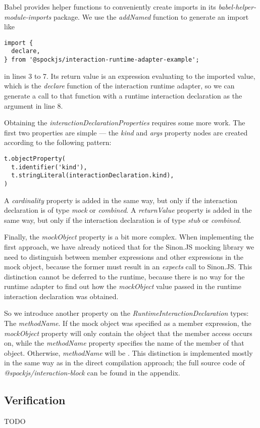 Babel provides helper functions to conveniently create imports
in its \textit{babel-helper-module-imports} package.
We use the \textit{addNamed} function to generate an import like
\begin{verbatim}
import {
  declare,
} from '@spockjs/interaction-runtime-adapter-example';
\end{verbatim}
in lines 3 to 7.
Its return value is an expression evaluating to the imported value,
which is the \textit{declare} function of the interaction runtime adapter,
so we can generate a call to that function
with a runtime interaction declaration as the argument in line 8.

Obtaining the \textit{interactionDeclarationProperties} requires some more work.
The first two properties are simple ---
the \textit{kind} and \textit{args} property nodes
are created according to the following pattern:
\begin{verbatim}
t.objectProperty(
  t.identifier('kind'),
  t.stringLiteral(interactionDeclaration.kind),
)
\end{verbatim}
A \textit{cardinality} property is added in the same way,
but only if the interaction declaration
is of type \textit{mock} or \textit{combined}.
A \textit{returnValue} property is added in the same way,
but only if the interaction declaration
is of type \textit{stub} or \textit{combined}.

Finally, the \textit{mockObject} property is a bit more complex.
When implementing the first approach,
we have already noticed that for the Sinon.JS mocking library
we need to distinguish between member expressions
and other expressions in the mock object,
because the former must result in an \textit{expects} call to Sinon.JS.
This distinction cannot be deferred to the runtime,
because there is no way for the runtime adapter
to find out how the \textit{mockObject} value
passed in the runtime interaction declaration was obtained.

So we introduce another property
on the \textit{RuntimeInteractionDeclaration} types:
The \textit{methodName}.
If the mock object was specified as a member expression,
the \textit{mockObject} property will only contain
the object that the member access occurs on,
while the \textit{methodName} property specifies
the name of the member of that object.
Otherwise, \textit{methodName} will be .
This distinction is implemented mostly in the same way
as in the direct compilation approach;
the full source code of \textit{@spockjs/interaction-block}
can be found in the appendix.

\subsection{Verification}
TODO

